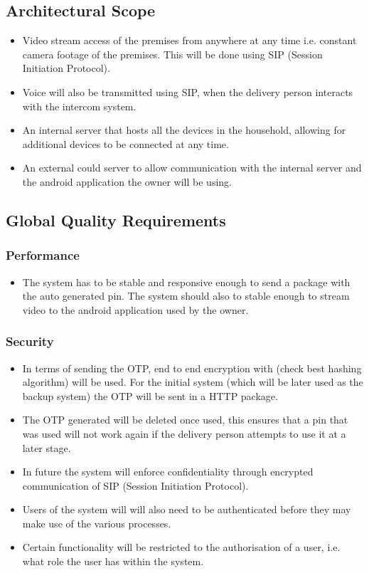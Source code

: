 \documentclass[a4paper,12pt]{article}
\begin{document}
	\newpage
	\subsection{Architectural Scope}
	\begin{itemize}
		\item Video stream access of the premises from anywhere at any time i.e. constant camera footage of the premises. This will be done using SIP (Session Initiation Protocol).
		
		\item Voice will also be transmitted using SIP, when the delivery person interacts with the intercom system.
		
		\item An internal server that hosts all the devices in the household, allowing for additional devices to be connected at any time. 
		
		\item An external could server to allow communication with the internal server and the android application the owner will be using. 
	\end{itemize}
	
	\subsection{Global Quality Requirements}
	
	\subsubsection{Performance}
	\begin{itemize}
		\item The system has to be stable and responsive enough to send a package with the auto generated pin. The system should also to stable enough to stream video to the android application used by the owner. 
	\end{itemize}
	
	\subsubsection{Security}
	\begin{itemize}
		\item In terms of sending the OTP, end to end encryption with (check best hashing algorithm) will be used. For the initial system (which will be later used as the backup system) the OTP will be sent in a HTTP package. 
		\item The OTP generated will be deleted once used, this ensures that a pin that was used will not work again if the delivery person attempts to use it at a later stage.
		\item In future the system will enforce confidentiality through encrypted communication of SIP (Session Initiation Protocol).
		\item Users of the system will will also need to be authenticated before they may make use of the various processes.
		\item Certain functionality will be restricted to the authorisation of a user, i.e. what role the user has within the system.
	\end{itemize}
	
\end{document}
